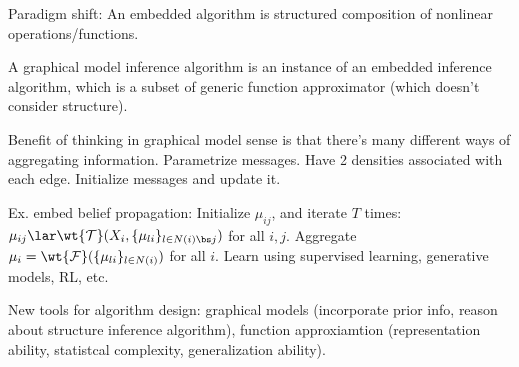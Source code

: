 Paradigm shift: An embedded algorithm is structured composition of nonlinear operations/functions.

A graphical model inference algorithm is an instance of an embedded inference algorithm, which is a subset of generic function approximator (which doesn't consider structure).

Benefit of thinking in graphical model sense is that there's many different ways of aggregating information. Parametrize messages. Have 2 densities associated with each edge. Initialize messages and update it. 

Ex. embed belief propagation: Initialize $\mu_{ij}$, and iterate $T$ times: $\mu_{ij}\lar \wt{\cal T}(X_i, \{\mu_{li}\}_{l\in N(i)\bs j})$ for all $i,j$. Aggregate $\mu_i = \wt{\cal F}(\{\mu_{li}\}_{l\in N(i)})$ for all $i$.
Learn using supervised learning, generative models, RL, etc.

New tools for algorithm design: graphical models (incorporate prior info, reason about structure inference algorithm), function approxiamtion (representation ability, statistcal complexity, generalization ability). 

